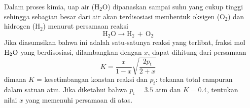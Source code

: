 \begin{soal}
Dalam proses kimia, uap air ($\mathrm{H}_{\mathrm{2}}\mathrm{O}$) dipanaskan sampai
suhu yang cukup tinggi sehingga sebagian besar dari air akan terdisosiasi membentuk oksigen
($\mathrm{O}_{2}$) dan hidrogen ($\mathrm{H}_{2}$) menurut persamaan reaksi
\begin{equation*}
\mathrm{H}_2\mathrm{O} \rightarrow \mathrm{H}_{2}\,+\,\mathrm{O}_{2}
\end{equation*}
Jika diasumsikan bahwa ini adalah satu-satunya reaksi yang terlibat, fraksi
mol $\ce{H2O}$ yang berdisosiasi, dilambangkan dengan $x$, dapat dihitung dari persamaan
\begin{equation*}
K = \frac{x}{1-x}\sqrt{\frac{2p_t}{2+x}}
\end{equation*}
dimana $K$ = kesetimbangan konstan reaksi dan $p_t$: tekanan total campuran
dalam satuan atm.
Jika diketahui bahwa $p_t = 3.5$ atm dan $K = 0.4$, tentukan nilai $x$ yang memenuhi
persamaan di atas.
\end{soal}